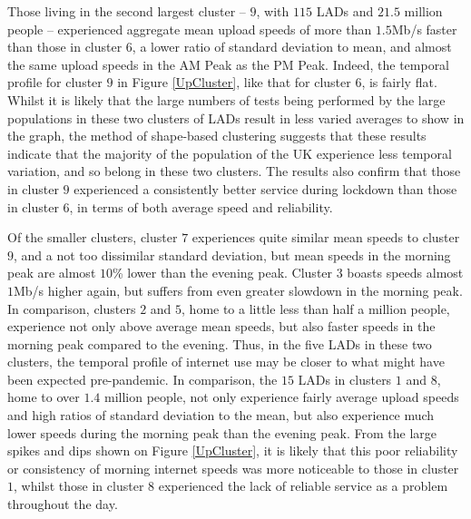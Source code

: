 \documentclass[]{interact}
\theoremstyle{plain}%
\theoremstyle{definition}
\theoremstyle{remark}
\begin{document}
Those living in the second largest cluster -- \(9\), with \(115\) LADs
and \(21.5\) million people -- experienced aggregate mean upload speeds
of more than \(1.5\)Mb/s faster than those in cluster \(6\), a lower
ratio of standard deviation to mean, and almost the same upload speeds
in the AM Peak as the PM Peak. Indeed, the temporal profile for cluster
\(9\) in Figure \ref{UpCluster}, like that for cluster \(6\), is fairly
flat. Whilst it is likely that the large numbers of tests being
performed by the large populations in these two clusters of LADs result
in less varied averages to show in the graph, the method of shape-based
clustering suggests that these results indicate that the majority of the
population of the UK experience less temporal variation, and so belong
in these two clusters. The results also confirm that those in cluster
\(9\) experienced a consistently better service during lockdown than
those in cluster \(6\), in terms of both average speed and reliability.

Of the smaller clusters, cluster \(7\) experiences quite similar mean
speeds to cluster \(9\), and a not too dissimilar standard deviation,
but mean speeds in the morning peak are almost \(10\)\% lower than the
evening peak. Cluster \(3\) boasts speeds almost \(1\)Mb/s higher again,
but suffers from even greater slowdown in the morning peak. In
comparison, clusters \(2\) and \(5\), home to a little less than half a
million people, experience not only above average mean speeds, but also
faster speeds in the morning peak compared to the evening. Thus, in the
five LADs in these two clusters, the temporal profile of internet use
may be closer to what might have been expected pre-pandemic. In
comparison, the \(15\) LADs in clusters \(1\) and \(8\), home to over
\(1.4\) million people, not only experience fairly average upload speeds
and high ratios of standard deviation to the mean, but also experience
much lower speeds during the morning peak than the evening peak. From
the large spikes and dips shown on Figure \ref{UpCluster}, it is likely
that this poor reliability or consistency of morning internet speeds was
more noticeable to those in cluster \(1\), whilst those in cluster \(8\)
experienced the lack of reliable service as a problem throughout the
day.
\end{document}
